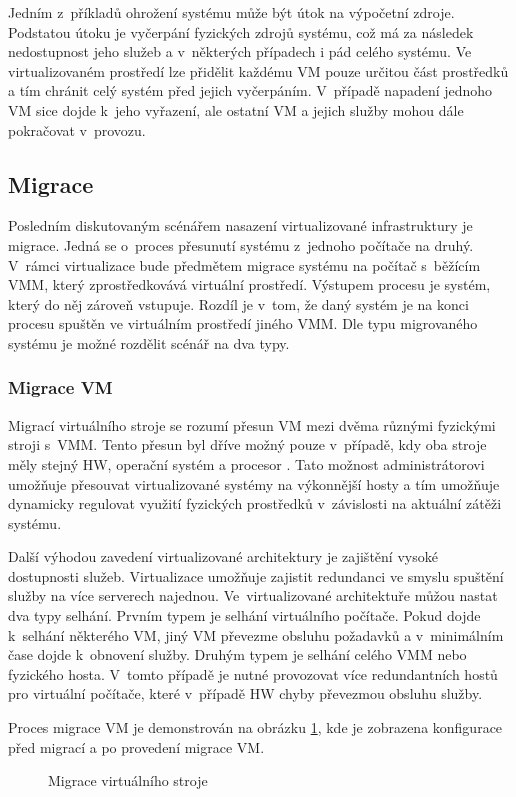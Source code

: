 Jedním z~příkladů ohrožení systému může být útok na výpočetní zdroje. Podstatou útoku je vyčerpání fyzických zdrojů systému,
což má za následek nedostupnost jeho služeb a v~některých případech i pád celého systému. Ve~   virtualizovaném prostředí lze
přidělit každému VM pouze určitou část prostředků a tím chránit celý systém před jejich vyčerpáním. V~případě napadení jednoho
VM sice dojde k~jeho vyřazení, ale ostatní VM a jejich služby mohou dále pokračovat v~provozu.
\subsection{Migrace}
\label{chapter:virtualization:deployment:migration}
Posledním diskutovaným scénářem nasazení virtualizované infrastruktury je migrace. Jedná se o~proces přesunutí systému z~jednoho
počítače na druhý. V~rámci virtualizace bude předmětem migrace systému na počítač s~běžícím VMM, který zprostředkovává
virtuální prostředí. Výstupem procesu je systém, který do něj zároveň vstupuje. Rozdíl je v~tom, že daný systém je na konci procesu
spuštěn ve virtuálním prostředí jiného VMM. Dle typu migrovaného systému je možné rozdělit scénář na dva typy.
\subsubsection{Migrace VM}
\label{chapter:virtualization:deployment:migration:virtual}
Migrací virtuálního stroje se rozumí přesun VM mezi dvěma různými fyzickými stroji s~VMM. Tento přesun byl dříve možný pouze
v~případě, kdy oba stroje měly stejný HW, operační systém a procesor \cite{oracle:virtualization:reasons}. Tato možnost administrátorovi
umožňuje přesouvat virtualizované systémy na výkonnější hosty a tím umožňuje dynamicky regulovat využití fyzických prostředků
v~závislosti na aktuální zátěži systému.

Další výhodou zavedení virtualizované architektury je zajištění vysoké dostupnosti služeb. Virtualizace umožňuje zajistit 
redundanci ve smyslu spuštění služby na více serverech najednou. Ve~virtualizované architektuře můžou nastat dva typy selhání.
Prvním typem je selhání virtuálního počítače. Pokud dojde k~selhání některého VM, jiný VM převezme obsluhu požadavků a
v~minimálním čase dojde k~obnovení služby. Druhým typem je selhání celého VMM nebo fyzického hosta. V~tomto případě je nutné
provozovat více redundantních hostů pro virtuální počítače, které v~případě HW chyby převezmou obsluhu služby.

Proces migrace VM je demonstrován na obrázku \ref{figure:migration:virtual}, kde je zobrazena konfigurace před migrací
a po provedení migrace VM.
\begin{figure}
    \centering    
    \caption{Migrace virtuálního stroje}
    \label{figure:migration:virtual}
\end{figure}
